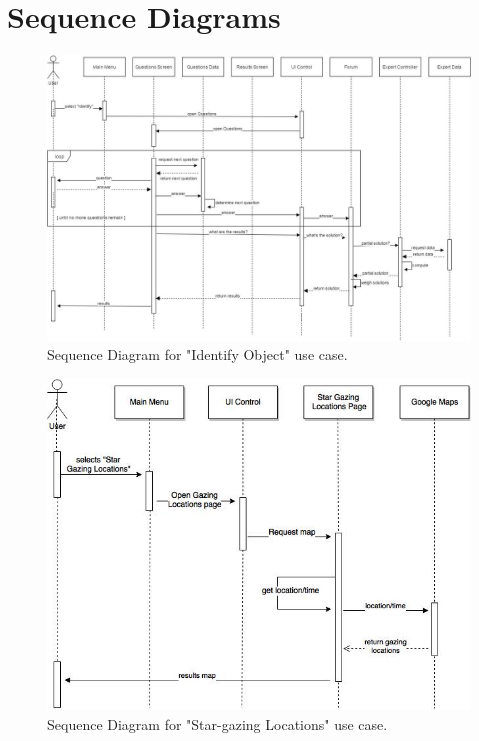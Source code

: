 \documentclass[]{article}
\begin{document}
\section{Sequence Diagrams}
\label{sec:sequence_diagrams}

\begin{figure}[!h]
    \caption{Sequence Diagram for "Identify Object" use case.}
    \centering
    \includegraphics[scale=0.35]{identifyobject.jpg}
\end{figure}

\begin{figure}[!h]
    \caption{Sequence Diagram for "Star-gazing Locations" use case.}
    \centering
    \includegraphics[scale=0.5]{stargazinglocation.jpg}
\end{figure}
\end{document}
